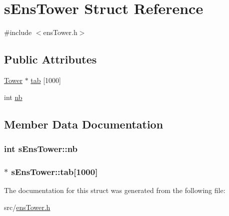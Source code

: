 \hypertarget{structs_ens_tower}{}\section{s\+Ens\+Tower Struct Reference}
\label{structs_ens_tower}


{\ttfamily \#include $<$ens\+Tower.\+h$>$}

\subsection*{Public Attributes}
\begin{DoxyCompactItemize}
\item 
\hyperlink{tower_8h_a5070e945849fb8f0b9f8e9049b7434ba}{Tower} $\ast$ \hyperlink{structs_ens_tower_a84af3c4420cb037a711b436c41ef6bf2}{tab} \mbox{[}1000\mbox{]}
\item 
int \hyperlink{structs_ens_tower_a92f7cb5d8f8be20ed5028e13f7a17d5e}{nb}
\end{DoxyCompactItemize}


\subsection{Member Data Documentation}
\hypertarget{structs_ens_tower_a92f7cb5d8f8be20ed5028e13f7a17d5e}{}
\subsubsection[{nb}]{\setlength{\rightskip}{0pt plus 5cm}int s\+Ens\+Tower\+::nb}\label{structs_ens_tower_a92f7cb5d8f8be20ed5028e13f7a17d5e}
\hypertarget{structs_ens_tower_a84af3c4420cb037a711b436c41ef6bf2}{}
\subsubsection[{tab}]{$\ast$ s\+Ens\+Tower\+::tab\mbox{[}1000\mbox{]}}\label{structs_ens_tower_a84af3c4420cb037a711b436c41ef6bf2}


The documentation for this struct was generated from the following file\+:\begin{DoxyCompactItemize}
\item 
src/\hyperlink{ens_tower_8h}{ens\+Tower.\+h}\end{DoxyCompactItemize}
